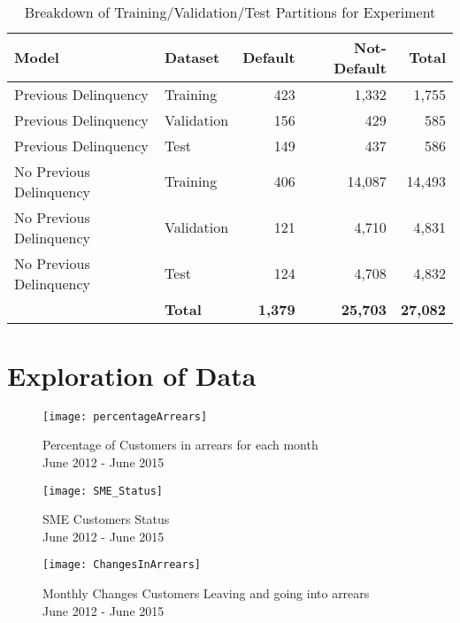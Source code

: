 \begin{table}[H]
	\centering\
	\resizebox{\textwidth}{!}
	{
		\begin{tabular}{l| l|r|r|r}
			\hline
			\textbf{Model} &  \textbf{Dataset} & \textbf{Default} & \textbf{Not-Default} & \textbf{Total} \\
			\hline
			Previous Delinquency          & Training       & 423 & 1,332 & 1,755 \\
			Previous Delinquency          & Validation       & 156 & 429 & 585 \\
			Previous Delinquency          & Test & 149 & 437 & 586 \\ \hline
			No Previous Delinquency          & Training & 406 & 14,087 & 14,493 \\ 
			No Previous Delinquency          & Validation & 121 & 4,710 & 4,831 \\
			No Previous Delinquency          & Test & 124 & 4,708 & 4,832 \\
			\hline
		       &      	\textbf{Total }     & \textbf{1,379} & \textbf{25,703} & \textbf{27,082} \\ \hline
		\end{tabular}
	}
	\caption{Breakdown of Training/Validation/Test Partitions for Experiment}
\end{table}


\section{Exploration of  Data}
\begin{figure}[H]
	\texttt{[image: percentageArrears]}
	\caption{Percentage of Customers in arrears for each month 
		\\ June 2012 - June 2015}
	\label{fig:percentageArrears}
\end{figure}

\begin{figure}[H]
	\texttt{[image: SME\_Status]}
	\caption{SME Customers Status\\ June 2012 - June 2015}
	\label{fig:SME_Status}
\end{figure}

\begin{figure}[H]
	\texttt{[image: ChangesInArrears]}
	\caption{Monthly Changes Customers Leaving and going into arrears\\June 2012 - June 2015}
	\label{fig:ChangesInArrears}
\end{figure}


